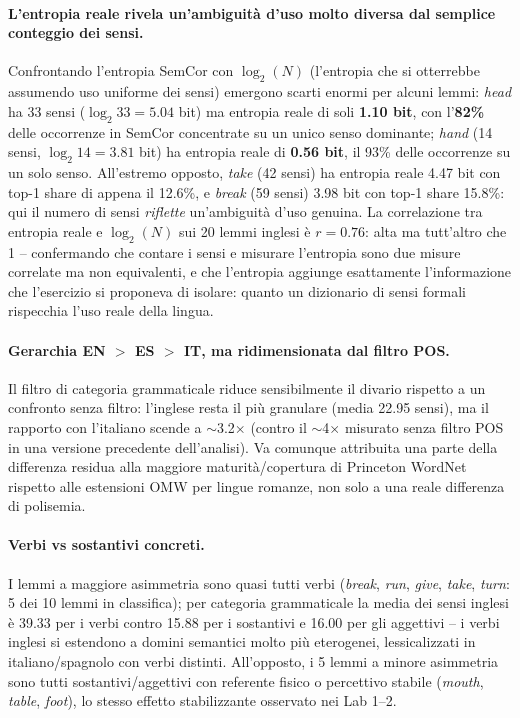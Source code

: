 \documentclass[12pt,a4paper]{article}
\begin{document}
\paragraph{L'entropia reale rivela un'ambiguit\`a d'uso molto diversa dal semplice conteggio dei sensi.} Confrontando l'entropia SemCor con $\log_2(N)$ (l'entropia che si otterrebbe assumendo uso uniforme dei sensi) emergono scarti enormi per alcuni lemmi: \textit{head} ha 33 sensi ($\log_2 33=5.04$ bit) ma entropia reale di soli \textbf{1.10 bit}, con l'\textbf{82\%} delle occorrenze in SemCor concentrate su un unico senso dominante; \textit{hand} (14 sensi, $\log_2 14=3.81$ bit) ha entropia reale di \textbf{0.56 bit}, il 93\% delle occorrenze su un solo senso. All'estremo opposto, \textit{take} (42 sensi) ha entropia reale 4.47 bit con top-1 share di appena il 12.6\%, e \textit{break} (59 sensi) 3.98 bit con top-1 share 15.8\%: qui il numero di sensi \emph{riflette} un'ambiguit\`a d'uso genuina. La correlazione tra entropia reale e $\log_2(N)$ sui 20 lemmi inglesi \`e $r=0.76$: alta ma tutt'altro che 1 -- confermando che contare i sensi e misurare l'entropia sono due misure correlate ma non equivalenti, e che l'entropia aggiunge esattamente l'informazione che l'esercizio si proponeva di isolare: quanto un dizionario di sensi formali rispecchia l'uso reale della lingua.

\paragraph{Gerarchia EN $>$ ES $>$ IT, ma ridimensionata dal filtro POS.} Il filtro di categoria grammaticale riduce sensibilmente il divario rispetto a un confronto senza filtro: l'inglese resta il pi\`u granulare (media 22.95 sensi), ma il rapporto con l'italiano scende a $\sim$3.2$\times$ (contro il $\sim$4$\times$ misurato senza filtro POS in una versione precedente dell'analisi). Va comunque attribuita una parte della differenza residua alla maggiore maturit\`a/copertura di Princeton WordNet rispetto alle estensioni OMW per lingue romanze, non solo a una reale differenza di polisemia.

\paragraph{Verbi vs sostantivi concreti.} I lemmi a maggiore asimmetria sono quasi tutti verbi (\textit{break}, \textit{run}, \textit{give}, \textit{take}, \textit{turn}: 5 dei 10 lemmi in classifica); per categoria grammaticale la media dei sensi inglesi \`e 39.33 per i verbi contro 15.88 per i sostantivi e 16.00 per gli aggettivi -- i verbi inglesi si estendono a domini semantici molto pi\`u eterogenei, lessicalizzati in italiano/spagnolo con verbi distinti. All'opposto, i 5 lemmi a minore asimmetria sono tutti sostantivi/aggettivi con referente fisico o percettivo stabile (\textit{mouth}, \textit{table}, \textit{foot}), lo stesso effetto stabilizzante osservato nei Lab 1--2.
\end{document}
